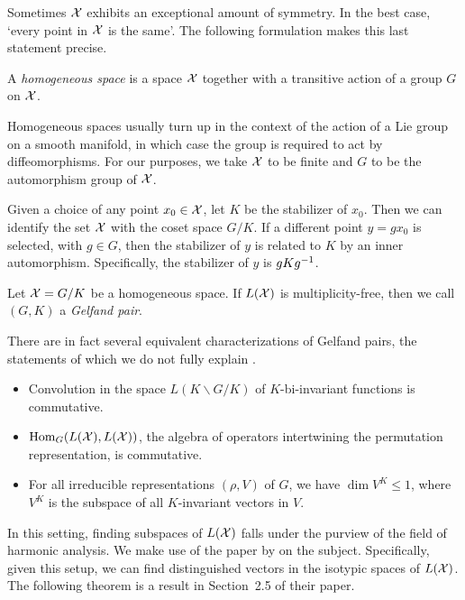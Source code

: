 \documentclass[cclicense]{hmcthesis}
\numberwithin{equation}{chapter}
\numberwithin{ucounter}{chapter}
\begin{document}
    Sometimes $\mathcal{X}$ exhibits an exceptional amount of symmetry.  In the best
    case, `every point in $\mathcal{X}$ is the same'.  The following formulation makes
    this last statement precise.
    \begin{definition}
        A \emph{homogeneous space} is a space $\mathcal{X}$ together with a transitive
        action of a group $G$ on $\mathcal{X}$.
    \end{definition}
    Homogeneous spaces usually turn up in the context of the action of a Lie
    group on a smooth manifold, in which case the group is required to act by
    diffeomorphisms.  For our purposes, we take $\mathcal{X}$ to be finite and $G$ to be
    the automorphism group of $\mathcal{X}$.

    Given a choice of any point $x_0 \in \mathcal{X}$, let $K$ be the stabilizer of
    $x_0$.  Then we can identify the set $\mathcal{X}$ with the coset space $G / K$.  If
    a different point $y = g x_0$ is selected, with $g \in G$, then the
    stabilizer of $y$ is related to $K$ by an inner automorphism.  Specifically,
    the stabilizer of $y$ is $g Kg^{-1}$.  
    
    \begin{definition}
        Let $\mathcal{X} = G / K$ be a homogeneous space.  If $L(\mathcal{X})$ is
        multiplicity-free, then we call $(G, K)$ a \emph{Gelfand pair}.
    \end{definition}
    There are in fact several equivalent characterizations of Gelfand pairs,
    the statements of which we do not fully explain \citep{Gelf}.
    \begin{itemize}\noparspace
    \item Convolution in the space $L(K\backslash G/K)$ of $K$-bi-invariant functions
    is commutative.
    \item $\mathrm{Hom}_G(L(\mathcal{X}), L(\mathcal{X}))$, the algebra of operators
    intertwining the permutation representation, is commutative.
    \item For all irreducible representations $(\rho, V)$ of $G$, we have
    $\dim V^K \le 1$, where $V^K$ is the subspace of all $K$-invariant
    vectors in $V$. 
    \end{itemize}

    In this setting, finding subspaces of $L(\mathcal{X})$ falls under the purview of
    the field of harmonic analysis.  We make use of the paper by \citet{Harm} on
    the subject.  Specifically, given this setup, we can find distinguished
    vectors in the isotypic spaces of $L(\mathcal{X})$.  The following theorem is a
    result in Section~2.5 of their paper.
\end{document}
